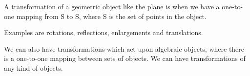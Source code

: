 A transformation of a geometric object like the plane is when we
have a one-to-one mapping from S to S, where S is the set
of points in the object.
\par
Examples are rotations, reflections, enlargements and translations.
\par
We can also have transformations which act upon algebraic objects,
where there is a one-to-one mapping between sets of objects. We can have transformations
of any kind of objects.